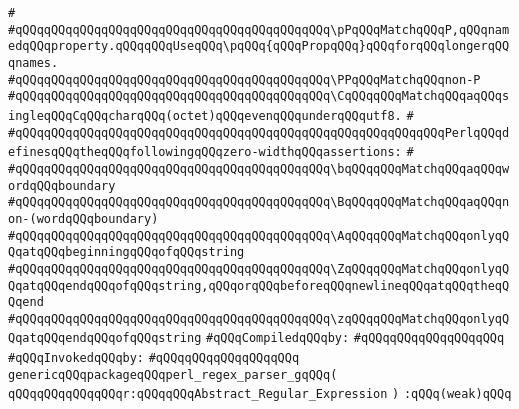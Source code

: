 \verb|#|\newline
\verb|#qQQqqQQqqQQqqQQqqQQqqQQqqQQqqQQqqQQqqQQqqQQq\pPqQQqMatchqQQqP,qQQqnamedqQQqproperty.qQQqqQQqUseqQQq\pqQQq{qQQqPropqQQq}qQQqforqQQqlongerqQQqnames.|\newline
\verb|#qQQqqQQqqQQqqQQqqQQqqQQqqQQqqQQqqQQqqQQqqQQq\PPqQQqMatchqQQqnon-P|\newline
\verb|#qQQqqQQqqQQqqQQqqQQqqQQqqQQqqQQqqQQqqQQqqQQq\CqQQqqQQqMatchqQQqaqQQqsingleqQQqCqQQqcharqQQq(octet)qQQqevenqQQqunderqQQqutf8.|\newline
\verb|#|\newline
\verb|#qQQqqQQqqQQqqQQqqQQqqQQqqQQqqQQqqQQqqQQqqQQqqQQqqQQqqQQqqQQqPerlqQQqdefinesqQQqtheqQQqfollowingqQQqzero-widthqQQqassertions:|\newline
\verb|#|\newline
\verb|#qQQqqQQqqQQqqQQqqQQqqQQqqQQqqQQqqQQqqQQqqQQq\bqQQqqQQqMatchqQQqaqQQqwordqQQqboundary|\newline
\verb|#qQQqqQQqqQQqqQQqqQQqqQQqqQQqqQQqqQQqqQQqqQQq\BqQQqqQQqMatchqQQqaqQQqnon-(wordqQQqboundary)|\newline
\verb|#qQQqqQQqqQQqqQQqqQQqqQQqqQQqqQQqqQQqqQQqqQQq\AqQQqqQQqMatchqQQqonlyqQQqatqQQqbeginningqQQqofqQQqstring|\newline
\verb|#qQQqqQQqqQQqqQQqqQQqqQQqqQQqqQQqqQQqqQQqqQQq\ZqQQqqQQqMatchqQQqonlyqQQqatqQQqendqQQqofqQQqstring,qQQqorqQQqbeforeqQQqnewlineqQQqatqQQqtheqQQqend|\newline
\verb|#qQQqqQQqqQQqqQQqqQQqqQQqqQQqqQQqqQQqqQQqqQQq\zqQQqqQQqMatchqQQqonlyqQQqatqQQqendqQQqofqQQqstring|\newline
\newline
\verb|#qQQqCompiledqQQqby:|\newline
\verb|#qQQqqQQqqQQqqQQqqQQq|\newline
\newline
\verb|#qQQqInvokedqQQqby:|\newline
\verb|#qQQqqQQqqQQqqQQqqQQq|\newline
\newline
\verb|genericqQQqpackageqQQqperl_regex_parser_gqQQq(|\newline
\verb|qQQqqQQqqQQqqQQqr:qQQqqQQqAbstract_Regular_Expression|\newline
\verb|)|\newline
\verb|:qQQq(weak)qQQq|\newline
